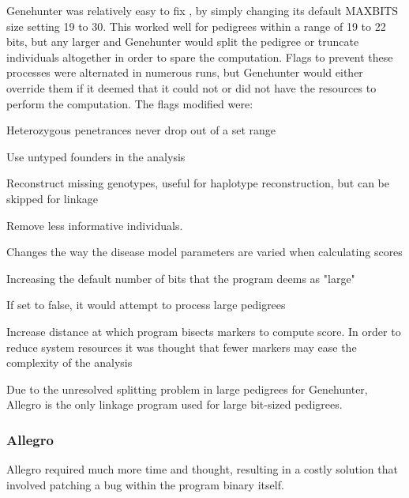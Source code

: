Genehunter was relatively easy to fix , by simply changing its default MAXBITS size setting 19 to 30. This worked well for pedigrees within a range of 19 to 22 bits, but any larger and Genehunter would split the pedigree or truncate individuals altogether in order to spare the computation. Flags to prevent these processes were alternated in numerous runs, but Genehunter would either override them if it deemed that it could not or did not have the resources  to perform the computation. The flags modified were:

\begin{description}[labelindent=-2em]
\item[\footnotesize PENETRANCE RESTRICTION]{Heterozygous penetrances never drop out of a set range}
\item[\footnotesize UNTYPED FOUNDERS <boolean>]{Use untyped founders in the analysis}
\item[\footnotesize SIMULATE UNTYPED <boolean>]{Reconstruct missing genotypes, useful for haplotype reconstruction, but can be skipped for linkage}
\item[\footnotesize DISCARD <boolean>]{Remove less informative individuals.}
\item[\footnotesize MAXIMISATION (standard|dense|grid|small)]{Changes the way the disease model parameters are varied when calculating scores}
\item[\footnotesize MAXBITS <integer>]{Increasing the default number of bits that the program deems as "large"}
\item[\footnotesize SKIP LARGE <boolean>]{If set to false, it would attempt to process large pedigrees}
\item[\footnotesize INCREMENT <integer>]{Increase distance at which program bisects markers to compute score. In order to reduce system resources it was thought that fewer markers may ease the complexity of the analysis}
\end{description}

Due to the unresolved splitting problem in large pedigrees for Genehunter, Allegro is the only linkage program used for large bit-sized pedigrees.


\subsubsection{Allegro}\label{ref:meth:allegrobigdata}

Allegro required much more time and thought, resulting in a costly solution that involved patching a bug within the program binary itself.  

